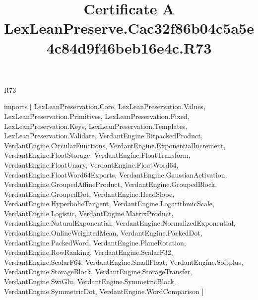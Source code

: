 \begin{lexlean}{R73}
\title{Certificate A LexLeanPreserve.Cac32f86b04c5a5e4c84d9f46beb16e4c.R73}
\begin{coremodule}
imports [
  LexLeanPreservation.Core,
  LexLeanPreservation.Values,
  LexLeanPreservation.Primitives,
  LexLeanPreservation.Fixed,
  LexLeanPreservation.Keys,
  LexLeanPreservation.Templates,
  LexLeanPreservation.Validate,
  VerdantEngine.BitpackedProduct,
  VerdantEngine.CircularFunctions,
  VerdantEngine.ExponentialIncrement,
  VerdantEngine.FloatStorage,
  VerdantEngine.FloatTransform,
  VerdantEngine.FloatUnary,
  VerdantEngine.FloatWord64,
  VerdantEngine.FloatWord64Exports,
  VerdantEngine.GaussianActivation,
  VerdantEngine.GroupedAffineProduct,
  VerdantEngine.GroupedBlock,
  VerdantEngine.GroupedDot,
  VerdantEngine.HeadSlope,
  VerdantEngine.HyperbolicTangent,
  VerdantEngine.LogarithmicScale,
  VerdantEngine.Logistic,
  VerdantEngine.MatrixProduct,
  VerdantEngine.NaturalExponential,
  VerdantEngine.NormalizedExponential,
  VerdantEngine.OnlineWeightedMean,
  VerdantEngine.PackedDot,
  VerdantEngine.PackedWord,
  VerdantEngine.PlaneRotation,
  VerdantEngine.RowRanking,
  VerdantEngine.ScalarF32,
  VerdantEngine.ScalarF64,
  VerdantEngine.SmallFloat,
  VerdantEngine.Softplus,
  VerdantEngine.StorageBlock,
  VerdantEngine.StorageTransfer,
  VerdantEngine.SwiGlu,
  VerdantEngine.SymmetricBlock,
  VerdantEngine.SymmetricDot,
  VerdantEngine.WordComparison
]


\end{coremodule}
\end{lexlean}
